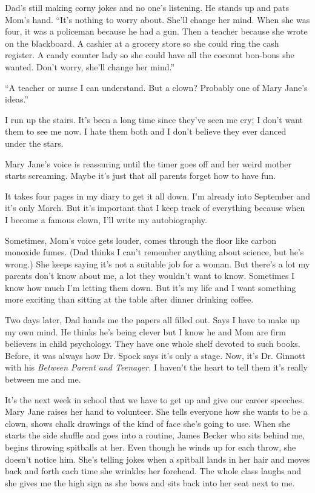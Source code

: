 \documentclass[
]{article}
\begin{document}
Dad's still making corny jokes and no one's listening. He stands up and
pats Mom's hand. ``It's nothing to worry about. She'll change her mind.
When she was four, it was a policeman because he had a gun. Then a
teacher because she wrote on the blackboard. A cashier at a grocery
store so she could ring the cash register. A candy counter lady so she
could have all the coconut bon-bons she wanted. Don't worry, she'll
change her mind.''

``A teacher or nurse I can understand. But a clown? Probably one of Mary
Jane's ideas.''

I run up the stairs. It's been a long time since they've seen me cry; I
don't want them to see me now. I hate them both and I don't believe they
ever danced under the stars.

Mary Jane's voice is reassuring until the timer goes off and her weird
mother starts screaming. Maybe it's just that all parents forget how to
have fun.

It takes four pages in my diary to get it all down. I'm already into
September and it's only March. But it's important that I keep track of
everything because when I become a famous clown, I'll write my
autobiography.

Sometimes, Mom's voice gets louder, comes through the floor like carbon
monoxide fumes. (Dad thinks I can't remember anything about science, but
he's wrong.) She keeps saying it's not a suit­able job for a woman. But
there's a lot my parents don't know about me, a lot they wouldn't want
to know. Sometimes I know how much I'm letting them down. But it's my
life and I want something more exciting than sitting at the table after
dinner drinking coffee.

Two days later, Dad hands me the papers all filled out. Says I have to
make up my own mind. He thinks he's being clever but I know he and Mom
are firm believers in child psychology. They have one whole shelf
devoted to such books. Before, it was always how Dr. Spock says it's
only a stage. Now, it's Dr. Ginnott with his \emph{Between Parent and
Teenager.} I haven't the heart to tell them it's really between me and
me.

It's the next week in school that we have to get up and give our career
speeches. Mary Jane raises her hand to volunteer. She tells everyone how
she wants to be a clown, shows chalk drawings of the kind of face she's
going to use. When she starts the side shuffle and goes into a routine,
James Becker who sits behind me, begins throwing spitballs at her. Even
though he winds up for each throw, she doesn't notice him. She's telling
jokes when a spitball lands in her hair and moves back and forth each
time she wrinkles her forehead. The whole class laughs and she gives me
the high sign as she bows and sits back into her seat next to me.
\end{document}
